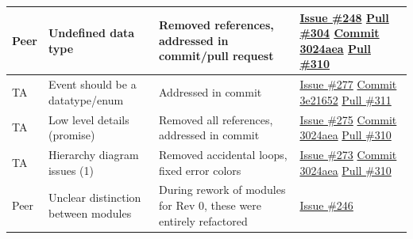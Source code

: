 \documentclass[12pt, titlepage]{article}
\begin{document}
\begin{longtable}{|p{2cm}|p{4cm}|p{5cm}|p{3cm}|}
Peer & Undefined data type & Removed references, addressed in commit/pull request & \href{https://github.com/OmarHassanAdelhamid/Five-of-a-Kind-capstone-project-/issues/248}{Issue \#248}
\newline\href{https://github.com/OmarHassanAdelhamid/Five-of-a-Kind-capstone-project-/pull/304}{Pull \#304}
\newline\href{https://github.com/OmarHassanAdelhamid/Five-of-a-Kind-capstone-project-/pull/310/commits/3024aea8910e0dafd3227d653f9d8359b277b5ec}{Commit 3024aea}
\newline\href{https://github.com/OmarHassanAdelhamid/Five-of-a-Kind-capstone-project-/pull/310}{Pull \#310} \\ \hline
TA & Event should be a datatype/enum & Addressed in commit & \href{https://github.com/OmarHassanAdelhamid/Five-of-a-Kind-capstone-project-/issues/277}{Issue \#277}
\newline\href{https://github.com/OmarHassanAdelhamid/Five-of-a-Kind-capstone-project-/pull/311/commits/3e21652aba486a639dda369b16c2b0d66f0f43e0}{Commit 3e21652}
\newline\href{https://github.com/OmarHassanAdelhamid/Five-of-a-Kind-capstone-project-/pull/311}{Pull \#311} \\ \hline
TA & Low level details (promise) & Removed all references, addressed in commit & \href{https://github.com/OmarHassanAdelhamid/Five-of-a-Kind-capstone-project-/issues/275}{Issue \#275}
\newline\href{https://github.com/OmarHassanAdelhamid/Five-of-a-Kind-capstone-project-/pull/310/commits/3024aea8910e0dafd3227d653f9d8359b277b5ec}{Commit 3024aea}
\newline\href{https://github.com/OmarHassanAdelhamid/Five-of-a-Kind-capstone-project-/pull/310}{Pull \#310} \\ \hline
TA & Hierarchy diagram issues (1) & Removed accidental loops, fixed error colors & \href{https://github.com/OmarHassanAdelhamid/Five-of-a-Kind-capstone-project-/issues/273}{Issue \#273}
\newline\href{https://github.com/OmarHassanAdelhamid/Five-of-a-Kind-capstone-project-/pull/310/commits/3024aea8910e0dafd3227d653f9d8359b277b5ec}{Commit 3024aea}
\newline\href{https://github.com/OmarHassanAdelhamid/Five-of-a-Kind-capstone-project-/pull/310}{Pull \#310} \\ \hline
Peer & Unclear distinction between modules & During rework of modules for Rev 0, these were entirely refactored & \href{https://github.com/OmarHassanAdelhamid/Five-of-a-Kind-capstone-project-/issues/246}{Issue \#246}

\end{longtable}
\end{document}
